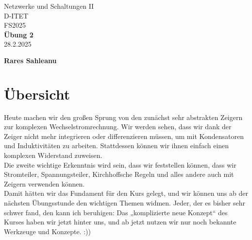 \documentclass[11pt,a4paper]{article}
\title{}
\date{}  %
\def \autor{Rares Sahleanu}
\def \uebung{Übung 2}
\begin{document}
\begin{titlepage}
	\centering
	{\Huge Netzwerke und Schaltungen II}\\[0.8cm]
	{\Large D-ITET}\\[0.8cm]
	{\Large FS2025}\\[3.5cm]

	{\Huge \textbf{\uebung}}\\[1cm]
	{\Large 28.2.2025}\\[3.5cm]


	\vfill
	{\Large \textbf{\autor}}
\end{titlepage}

\newpage

\newpage
\pagestyle{fancy}

\fancyhead[C]{\small \textit{\uebung}}
\fancyhead[R]{\small \textit{\autor}}

\fancyfoot[L]{}
\fancyfoot[C]{\thepage}
\fancyfoot[R]{}

\renewcommand{\headrulewidth}{0.4pt}
\renewcommand{\footrulewidth}{0pt}


\section{Übersicht}  
Heute machen wir den großen Sprung von den zunächst sehr abstrakten Zeigern zur komplexen Wechselstromrechnung. Wir werden sehen, dass wir dank der Zeiger nicht mehr integrieren oder differenzieren müssen, um mit Kondensatoren und Induktivitäten zu arbeiten. Stattdessen können wir ihnen einfach einen komplexen Widerstand zuweisen. \\

Die zweite wichtige Erkenntnis wird sein, dass wir feststellen können, dass wir Stromteiler, Spannungsteiler, Kirchhoffsche Regeln und alles andere auch mit Zeigern verwenden können. \\

Damit hätten wir das Fundament für den Kurs gelegt, und wir können uns ab der nächsten Übungsstunde den wichtigen Themen widmen. Jeder, der es bisher sehr schwer fand, den kann ich beruhigen: Das „komplizierte neue Konzept“ des Kurses haben wir jetzt hinter uns, und ab jetzt nutzen wir nur noch bekannte Werkzeuge und Konzepte. :))
\vspace{1cm}
\end{document}
